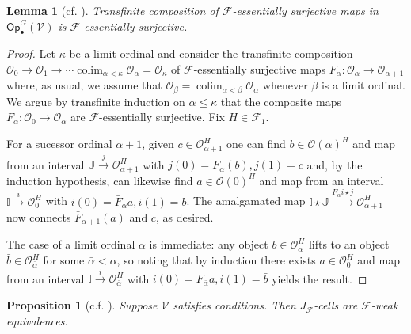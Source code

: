 \documentclass[a4paper,10pt
,draft
]{article}%
\numberwithin{equation}{section}
\numberwithin{figure}{section}
\newtheorem{lemma}[equation]{Lemma}%
\newtheorem{proposition}[equation]{Proposition}%
\theoremstyle{definition} %
\newcommand{\Op}{\mathsf{Op}}%
\DeclareMathOperator{\colim}{colim}%
\newcommand{\F}{\ensuremath{\mathcal F}}
\newcommand{\V}{\ensuremath{\mathcal V}}
\renewcommand{\O}{\ensuremath{\mathcal O}}
\newcommand{\1}{\ensuremath{\mathbbm 1}}%
\begin{document}
\begin{lemma}[cf. {\cite[4.17]{Cav}}]
\label{TRANSCOMP_ES_LEM}
      Transfinite composition of $\F$-essentially surjective maps in $\Op^G_\bullet(\V)$ is $\F$-essentially surjective.
\end{lemma}



\begin{proof}
Let $\kappa$ be a limit ordinal and consider the transfinite composition
$\O_0 \to \O_1 \to \cdots \colim_{\alpha < \kappa} \O_{\alpha} = \O_{\kappa}$
of $\F$-essentially surjective maps
$F_{\alpha} \colon \O_{\alpha} \to \O_{\alpha +1}$ where, as usual, 
we assume that $\O_{\beta} = \colim_{\alpha < \beta} \O_{\alpha}$ whenever $\beta$ is a limit ordinal.
We argue by transfinite induction on $\alpha \leq \kappa$
that the composite maps $\bar{F}_{\alpha} \colon \O_0 \to \O_{\alpha}$
are $\F$-essentially surjective. Fix $H \in \F_1$.

For a sucessor ordinal $\alpha+1$, given $c \in \O_{\alpha+1}^H$
one can find $b \in \O(\alpha)^H$ and map from an interval 
$\mathbb{J} \xrightarrow{j} \O_{\alpha+1}^H$ with $j(0) = F_{\alpha}(b),j(1)=c$
and, by the induction hypothesis, can likewise find
$a \in \O(0)^H$ and map from an interval $\mathbb{I} \xrightarrow{i} \O_0^H$
with $i(0)=\bar{F}_{\alpha}a,i(1)=b$.
The amalgamated map
$\mathbb{I} \star \mathbb{J} \xrightarrow{F_{\alpha}i \star j} \O_{\alpha+1}^H$
now connects $\bar{F}_{\alpha+1}(a)$ and $c$, as desired.

The case of a limit ordinal $\alpha$ is immediate: any object $b \in \O_{\alpha}^H$
lifts to an object $\bar{b} \in \O_{\bar{\alpha}}^H$ for some $\bar{\alpha} < \alpha$,
so noting that by induction there exists $a \in \O_0^H$ and map from an interval $\mathbb{I} \xrightarrow{i} \O_{\bar{\alpha}}^H$
with $i(0) = F_{\bar{\alpha}}a,i(1) = \bar{b}$ yields the result.
\end{proof}




\begin{proposition}[{c.f. \cite[4.20]{Cav}}]\label{J-CELL_PROP}
      Suppose $\V$ satisfies {\color{blue} conditions}. Then $J_{\F}$-cells are $\F$-weak equivalences.
\end{proposition}
\end{document}
